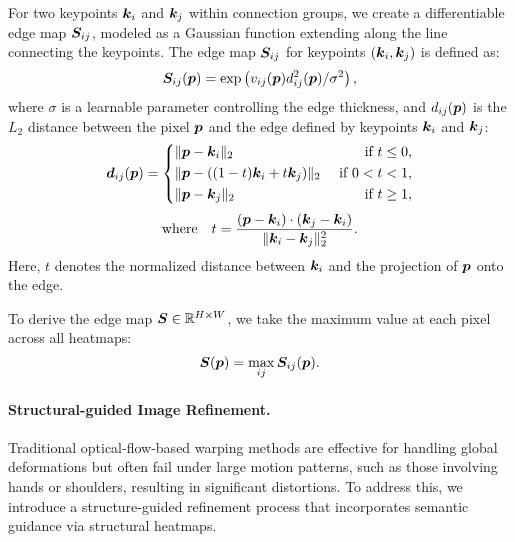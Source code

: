 For two keypoints \({\bm{k}}_i\) and \({\bm{k}}_j\) within connection groups, we create a differentiable edge map \({\bm{S}}_{ij}\), modeled as a Gaussian function extending along the line connecting the keypoints. The edge map \({\bm{S}}_{ij}\) for keypoints \(({\bm{k}}_i, {\bm{k}}_j)\) is defined as:
\begin{equation}
    {\bm{S}}_{ij}({\bm{p}}) = \exp\left(v_{ij}({\bm{p}})d^2_{ij}({\bm{p}}) / \sigma^2\right), 
    \label{eq:edge}
\end{equation}
where \(\sigma\) is a learnable parameter controlling the edge thickness, and \(d_{ij}({\bm{p}})\) is the \(L_2\) distance between the pixel \({\bm{p}}\) and the edge defined by keypoints \({\bm{k}}_i\) and \({\bm{k}}_j\):
\begin{equation} 
{\bm{d}}_{ij}({\bm{p}}) = \left\{ \begin{aligned} 
& \|{\bm{p}}-{\bm{k}}_i\|_2 & \text{ if } t \leq 0, \\ 
& \|{\bm{p}}-((1-t){\bm{k}}_i + t{\bm{k}}_j)\|_2 & \text{ if } 0 < t < 1, \\ 
& \|{\bm{p}}-{\bm{k}}_j\|_2 & \text{ if } t \geq 1, 
\end{aligned} \right.
\end{equation}
\begin{equation} 
\text{where} \quad t = \frac{({\bm{p}}-{\bm{k}}_i)\cdot ({\bm{k}}_j-{\bm{k}}_i)}{\|{\bm{k}}_i-{\bm{k}}_j\|^2_2}.
\end{equation}
Here, \(t\) denotes the normalized distance between \({\bm{k}}_i\) and the projection of \({\bm{p}}\) onto the edge.

To derive the edge map \({\bm{S}} \in \mathbb{R}^{H \times W}\), we take the maximum value at each pixel across all heatmaps:
\begin{equation}
   {\bm{S}}({\bm{p}})  = \max_{ij} {\bm{S}}_{ij}({\bm{p}}).
   \label{eq:max_heatmap}
\end{equation}


\vspace{-0.5cm}
\paragraph{Structural-guided Image Refinement.}  
Traditional optical-flow-based warping methods are effective for handling global deformations but often fail under large motion patterns, such as those involving hands or shoulders, resulting in significant distortions. To address this, we introduce a structure-guided refinement process that incorporates semantic guidance via structural heatmaps.

